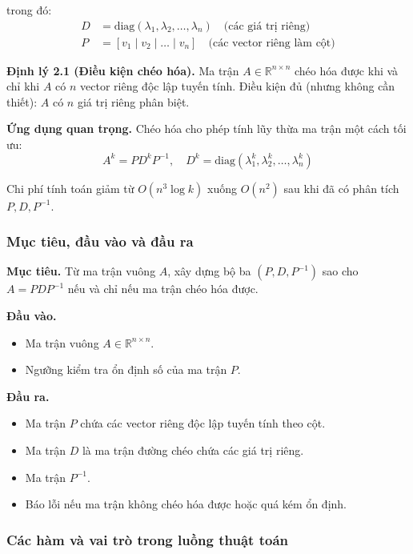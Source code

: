 \documentclass[a4paper]{article}
\begin{document}
trong đó:
\begin{align}
    D &= \text{diag}(\lambda_1, \lambda_2, \ldots, \lambda_n) \quad \text{(các giá trị riêng)}\\
    P &= [v_1 \mid v_2 \mid \ldots \mid v_n] \quad \text{(các vector riêng làm cột)}
\end{align}

\textbf{Định lý 2.1 (Điều kiện chéo hóa).} Ma trận $A \in \mathbb{R}^{n \times n}$ chéo hóa được khi và chỉ khi $A$ có $n$ vector riêng độc lập tuyến tính. Điều kiện đủ (nhưng không cần thiết): $A$ có $n$ giá trị riêng phân biệt.

\textbf{Ứng dụng quan trọng.} Chéo hóa cho phép tính lũy thừa ma trận một cách tối ưu:
$$A^k = PD^k P^{-1}, \quad D^k = \text{diag}(\lambda_1^k, \lambda_2^k, \ldots, \lambda_n^k)$$

Chi phí tính toán giảm từ $O(n^3 \log k)$ xuống $O(n^2)$ sau khi đã có phân tích $P, D, P^{-1}$.

\subsubsection{Mục tiêu, đầu vào và đầu ra}

\textbf{Mục tiêu.} Từ ma trận vuông $A$, xây dựng bộ ba $(P, D, P^{-1})$ sao cho $A = PDP^{-1}$ nếu và chỉ nếu ma trận chéo hóa được.

\textbf{Đầu vào.}
\begin{itemize}
    \item Ma trận vuông $A \in \mathbb{R}^{n \times n}$.
    \item Ngưỡng kiểm tra ổn định số của ma trận $P$.
\end{itemize}

\textbf{Đầu ra.}
\begin{itemize}
    \item Ma trận $P$ chứa các vector riêng độc lập tuyến tính theo cột.
    \item Ma trận $D$ là ma trận đường chéo chứa các giá trị riêng.
    \item Ma trận $P^{-1}$.
    \item Báo lỗi nếu ma trận không chéo hóa được hoặc quá kém ổn định.
\end{itemize}

\subsubsection{Các hàm và vai trò trong luồng thuật toán}
\end{document}

